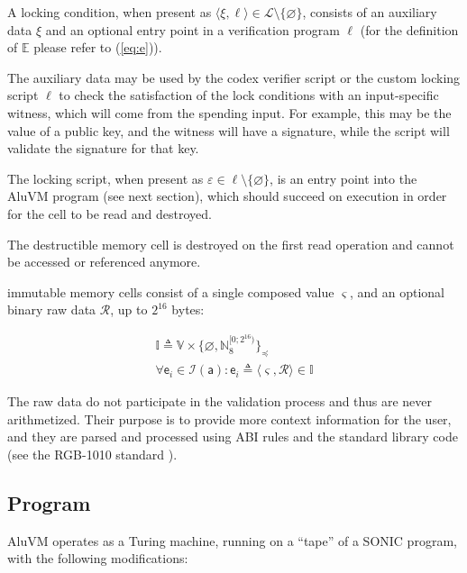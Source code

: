 \documentclass[9pt,oneside]{amsart}
\begin{document}
\begin{multicols}{2}
A locking condition, when present as $\langle \xi, \ell \rangle \in \mathcal{L} \setminus \{ \varnothing \}$,
consists of an auxiliary data $\xi$ and an optional entry point in a verification program $\ell$
(for the definition of $\mathbb{E}$ please refer to (\ref{eq:e})).

The auxiliary data may be used by the codex verifier script or the custom locking script $\ell$
to check the satisfaction of the lock conditions with an input-specific witness,
which will come from the spending input.
For example, this may be the value of a public key, and the witness will have a signature,
while the script will validate the signature for that key.

The locking script, when present as $\varepsilon \in \ell \setminus \{ \varnothing \}$,
is an entry point into the AluVM program (see next section),
which should succeed on execution in order for the cell to be read and destroyed.

The destructible memory cell is destroyed on the first read operation
and cannot be accessed or referenced anymore.

\Gls{immutable memory} cells consist of a single \gls{composed value} $\varsigma$,
and an optional binary raw data $\mathcal{R}$, up to $2^{16}$ bytes:

\begin{gather}
\mathbb{I} \triangleq \mathbb{V} \times \{ \varnothing, \mathbb{N}_8^{[0; 2^{16})} \}_\preceq \\
\forall \mathsf{e}_i \in \mathcal{I}(\mathsf{a}) : \mathsf{e}_i \triangleq \langle \varsigma, \mathcal{R} \rangle \in \mathbb{I}
\end{gather}

The raw data do not participate in the validation process and thus are never arithmetized.
Their purpose is to provide more context information for the user, and they are parsed and processed
using ABI rules and the standard library code (see the RGB-1010 standard \cite{RGB1010}).


\subsection{Program}\label{Program}

AluVM operates as a Turing machine, running on a ``tape'' of a SONIC program,
with the following modifications:


\end{multicols}
\end{document}
